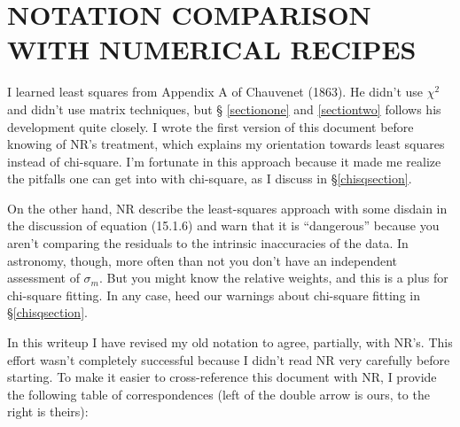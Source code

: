 \documentclass[psfig,preprint]{aastex}
\begin{document}
\section{ NOTATION COMPARISON WITH NUMERICAL RECIPES}

	I learned least squares from Appendix A of Chauvenet (1863). He
didn't use $\chi^2$ and didn't use matrix techniques, but \S
\ref{sectionone} and \ref{sectiontwo} follows his development quite
closely. I wrote the first version of this document before knowing of
NR's treatment, which explains my orientation towards least squares
instead of chi-square. I'm fortunate in this approach because it made me
realize the pitfalls one can get into with chi-square, as I discuss in
\S \ref{chisqsection}. 

	On the other hand, NR describe the least-squares approach with
some disdain in the discussion of equation (15.1.6) and warn that it is
``dangerous'' because you aren't comparing the residuals to the
intrinsic inaccuracies of the data.  In astronomy, though, more often
than not you don't have an independent assessment of $\sigma_{m}$. 
But you might know the relative weights, and this is a plus for
chi-square fitting.  In any case, heed our warnings about chi-square
fitting in \S \ref{chisqsection}. 

	In this writeup I have revised my old notation to agree,
partially, with NR's. This effort wasn't completely successful because I
didn't read NR very carefully before starting. To make it easier to
cross-reference this document with NR, I provide the following table of
correspondences (left of the double arrow is ours, to the right is
theirs): 
\end{document}
